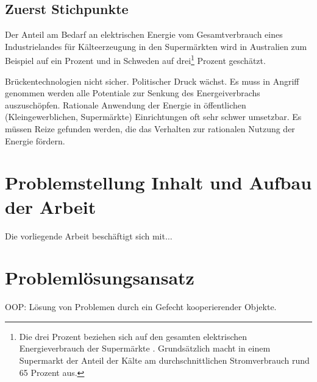 \subsection*{Zuerst Stichpunkte}

Der Anteil am Bedarf an elektrischen Energie vom Gesamtverbrauch eines Industrielandes für Kälteerzeugung in den Supermärkten
wird in Australien zum Beispiel auf ein Prozent \cite[Seite 8]{australia} und in Schweden auf drei\footnote{ Die drei Prozent
beziehen sich auf den gesamten elektrischen Energieverbrauch der Supermärkte \cite[Seite 6]{doctor}. Grundsätzlich macht in
einem Supermarkt der Anteil der Kälte am durchschnittlichen Stromverbrauch rund 65 Prozent aus.\cite{EANRW}} Prozent
geschätzt.

Brückentechnologien nicht sicher. Politischer Druck wächst. Es muss in Angriff genommen werden alle Potentiale zur Senkung
des Energeiverbrachs auszuschöpfen.  Rationale Anwendung der Energie in öffentlichen (Kleingewerblichen, Supermärkte)
Einrichtungen oft sehr schwer umsetzbar. Es müssen Reize gefunden werden, die das Verhalten zur rationalen Nutzung der
Energie fördern.



\section{Problemstellung Inhalt und Aufbau der Arbeit}
Die vorliegende Arbeit beschäftigt sich mit$\ldots$

\section{Problemlösungsansatz}

OOP: Lösung von Problemen durch ein Gefecht kooperierender Objekte.\cite{java}
